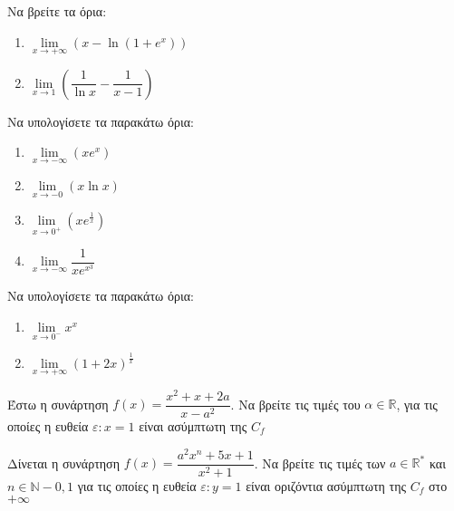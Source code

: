 \documentclass{presentation}
\begin{document}
\begin{askisi}
    Να βρείτε τα όρια:
    \begin{enumerate}
        \item<1-> $\lim\limits_{x \to +\infty}{ (x-\ln (1+e^x)) }$
        \item<2-> $\lim\limits_{x \to 1}{ \left( \dfrac{1}{\ln x} - \dfrac{1}{x-1} \right)  }$
    \end{enumerate}

\end{askisi}

\begin{askisi}
    Να υπολογίσετε τα παρακάτω όρια:
    \begin{enumerate}
        \item<1-> $\lim\limits_{x \to -\infty}{ (xe^x) }$
        \item<2-> $\lim\limits_{x \to -0}{ (x\ln x) }$
        \item<3-> $\lim\limits_{x \to 0^+}{ \left( xe^{\frac{1}{x}} \right)  }$
        \item<4-> $\lim\limits_{x \to -\infty}{ \dfrac{1}{xe^{x^3}} }$
    \end{enumerate}

\end{askisi}

\begin{askisi}
    Να υπολογίσετε τα παρακάτω όρια:
    \begin{enumerate}
        \item<1-> $\lim\limits_{x \to 0^-}{ x^x }$
        \item<2-> $\lim\limits_{x \to +\infty}{ \left( 1+2x \right)^{\frac{1}{x}}  }$
    \end{enumerate}

\end{askisi}

\begin{askisi}
    Έστω η συνάρτηση $f(x)=\dfrac{x^2+x+2a}{x-a^2}$. Να βρείτε τις τιμές του $α\in\mathbb{R}$, για τις οποίες η ευθεία $ε:x=1$ είναι ασύμπτωτη της $C_f$

\end{askisi}

\begin{askisi}
    Δίνεται η συνάρτηση $f(x)=\dfrac{a^2x^n+5x+1}{x^2+1}$. Να βρείτε τις τιμές των $a\in\mathbb{R}^*$ και $n\in\mathbb{N}-{0,1}$ για τις οποίες η ευθεία $ε:y=1$ είναι οριζόντια ασύμπτωτη της $C_f$ στο $+\infty$

\end{askisi}
\end{document}
